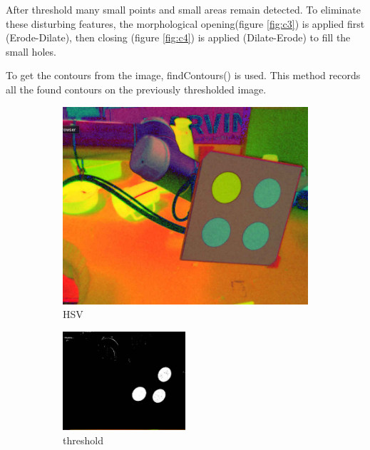 After threshold many small points and small areas remain detected. To eliminate these disturbing features, the morphological 
opening(figure \ref{fig:c3})  is applied first (Erode-Dilate), then closing (figure \ref{fig:c4}) is applied (Dilate-Erode) to fill the small holes. 

To get the contours from the image, findContours() is used. This method records all the found contours on the previously thresholded
image.

\begin{figure}[ht!]
	\begin{subfigure}{.49\textwidth}
		\centering
		\includegraphics[width=\textwidth]{figures/color1}
	\caption{HSV}
	\label{fig:c1}
	\end{subfigure}
	\begin{subfigure}{\textwidth}
		\centering
\includegraphics[width=0.5\textwidth]{figures/color2}
	\caption{threshold}
	\label{fig:c2}
	\end{subfigure}
		\begin{subfigure}{.49\textwidth}

\end{subfigure}
\end{figure}
